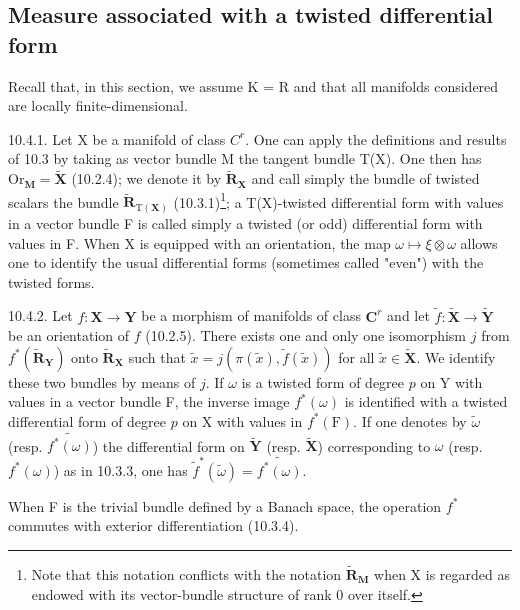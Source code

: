 \subsection{Measure associated with a twisted differential form}

Recall that, in this section, we assume K = R and that all manifolds considered are locally finite-dimensional.

10.4.1. Let X be a manifold of class \(C^{r}\). One can apply the definitions and results of 10.3 by taking as vector bundle M the tangent bundle T(X). One then has \(\mathrm{Or}_{\mathbf{M}} = \tilde{\mathbf{X}}\) (10.2.4); we denote it by \(\tilde{\mathbf{R}}_{\mathbf{X}}\) and call simply the bundle of twisted scalars the bundle \(\tilde{\mathbf{R}}_{\mathrm{T}(\mathbf{X})}\) (10.3.1)\footnote{Note that this notation conflicts with the notation \(\widetilde{\mathbf{R}}_{\mathbf{M}}\) when X is regarded as endowed with its vector-bundle structure of rank 0 over itself.}; a T(X)-twisted differential form with values in a vector bundle F is called simply a twisted (or odd) differential form with values in F. When X is equipped with an orientation, the map \(\omega \mapsto \xi \otimes \omega\) allows one to identify the usual differential forms (sometimes called "even") with the twisted forms.

10.4.2. Let \(f\colon\mathbf{X}\to\mathbf{Y}\) be a morphism of manifolds of class \(\mathbf{C}^{r}\) and let \(\tilde{f}\colon\tilde{\mathbf{X}}\to\tilde{\mathbf{Y}}\) be an orientation of \(f\) (10.2.5). There exists one and only one isomorphism \(j\) from \(f^{*}(\widetilde{\mathbf{R}}_{\mathbf{Y}})\) onto \(\widetilde{\mathbf{R}}_{\mathbf{X}}\) such that \(\tilde{x}=j(\pi(\tilde{x}),\tilde{f}(\tilde{x}))\) for all \(\tilde{x}\in\tilde{\mathbf{X}}\). We identify these two bundles by means of \(j\). If \(\omega\) is a twisted form of degree \(p\) on Y with values in a vector bundle F, the inverse image \(f^{*}(\omega)\) is identified with a twisted differential form of degree \(p\) on X with values in \(f^{*}(\mathrm{F})\). If one denotes by \(\tilde{\omega}\) (resp. \(\widetilde{f^{*}(\omega)}\)) the differential form on \(\tilde{\mathbf{Y}}\) (resp. \(\tilde{\mathbf{X}}\)) corresponding to \(\omega\) (resp. \(f^{*}(\omega)\)) as in 10.3.3, one has \(\tilde{f}^{*}(\tilde{\omega})=\widetilde{f^{*}(\omega)}\).

When F is the trivial bundle defined by a Banach space, the operation \(f^*\) commutes with exterior differentiation (10.3.4).

